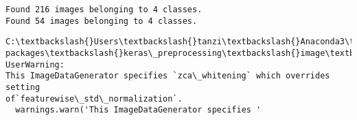 \documentclass[11pt]{article}
\begin{document}
    \begin{Verbatim}[commandchars=\\\{\}]
Found 216 images belonging to 4 classes.
Found 54 images belonging to 4 classes.
    \end{Verbatim}

    \begin{Verbatim}[commandchars=\\\{\}]
C:\textbackslash{}Users\textbackslash{}tanzi\textbackslash{}Anaconda3\textbackslash{}lib\textbackslash{}site-
packages\textbackslash{}keras\_preprocessing\textbackslash{}image\textbackslash{}image\_data\_generator.py:341: UserWarning:
This ImageDataGenerator specifies `zca\_whitening` which overrides setting
of`featurewise\_std\_normalization`.
  warnings.warn('This ImageDataGenerator specifies '
    \end{Verbatim}
\end{document}

